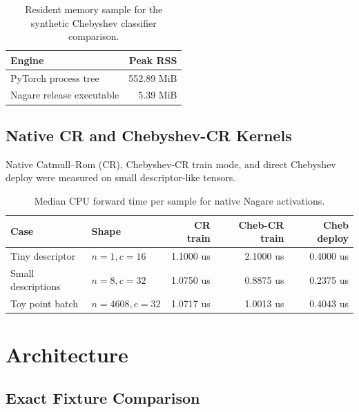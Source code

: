 \documentclass[11pt]{article}
\begin{document}
\begin{table}[h]
\centering
\begin{tabular}{lr}
\toprule
Engine & Peak RSS \\
\midrule
PyTorch process tree & 552.89 MiB \\
Nagare release executable & 5.39 MiB \\
\bottomrule
\end{tabular}
\caption{Resident memory sample for the synthetic Chebyshev classifier comparison.}
\end{table}

\subsection{Native CR and Chebyshev-CR Kernels}

Native Catmull--Rom (CR), Chebyshev-CR train mode, and direct Chebyshev deploy
were measured on small descriptor-like tensors.

\begin{table}[h]
\centering
\begin{tabular}{llrrr}
\toprule
Case & Shape & CR train & Cheb-CR train & Cheb deploy \\
\midrule
Tiny descriptor & \(n=1,c=16\) & 1.1000 us & 2.1000 us & 0.4000 us \\
Small descriptions & \(n=8,c=32\) & 1.0750 us & 0.8875 us & 0.2375 us \\
Toy point batch & \(n=4608,c=32\) & 1.0717 us & 1.0013 us & 0.4043 us \\
\bottomrule
\end{tabular}
\caption{Median CPU forward time per sample for native Nagare activations.}
\end{table}

\section{Architecture}

\subsection{Exact Fixture Comparison}
\end{document}
